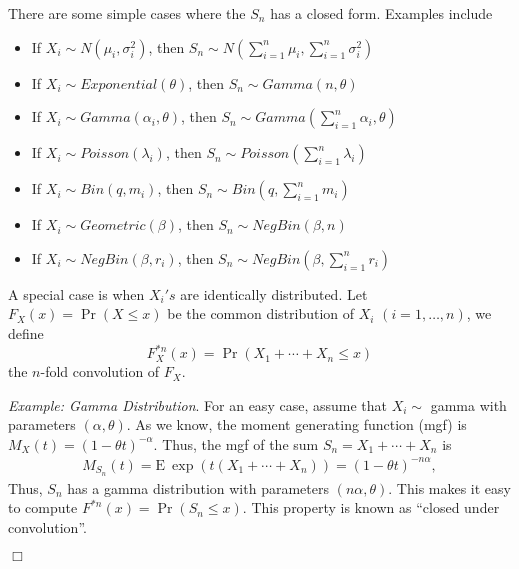 \documentclass[12pt,letterpaper]{article}
\begin{document}
There are some simple cases where the $S_n$ has a closed form. Examples include
  \begin{itemize}
   \item If $X_i\sim N(\mu_i,\sigma_i^2)$, then $S_n\sim N(\sum_{i=1}^{n}\mu_i,\sum_{i=1}^{n}\sigma_i^2)$
   \item If $X_i\sim Exponential(\theta)$, then $S_n\sim Gamma(n,\theta)$
   \item If $X_i\sim Gamma(\alpha_i,\theta)$, then $S_n\sim Gamma(\sum_{i=1}^n\alpha_i,\theta)$
   \item If $X_i\sim Poisson(\lambda_i)$, then $S_n\sim Poisson(\sum_{i=1}^{n}\lambda_i)$
   \item If $X_i\sim Bin(q,m_i)$, then $S_n\sim Bin(q,\sum_{i=1}^n m_i)$
   \item If $X_i\sim Geometric(\beta)$, then $S_n\sim NegBin(\beta,n)$
   \item If $X_i\sim NegBin(\beta,r_i)$, then $S_n\sim NegBin(\beta,\sum_{i=1}^n r_i)$
  \end{itemize}



A special case is when $X_i's$ are identically distributed. Let $F_X(x)={\Pr}(X\leq x)$ be the common distribution of $X_i$ $(i=1,\ldots,n)$, we define
   $$F^{*n}_X(x)={\Pr}(X_1+\cdots+X_n\leq x)$$
the $n$-fold convolution of $F_X$.

\bigskip

\noindent \textit{Example: Gamma Distribution}. For an easy case, assume that $X_i \sim$ gamma with parameters $(\alpha, \theta) $. As we know, the moment generating function (mgf) is $M_{X}(t) = (1 - \theta t)^{- \alpha}$. Thus, the mgf of the sum $S_n = X_1 + \cdots + X_n$ is
\begin{eqnarray*}
M_{S_n}(t) = \mathrm{E~} \exp(t(X_1 + \cdots + X_n)) = (1 - \theta t)^{-n \alpha} ,
\end{eqnarray*}
Thus, $S_n$ has a gamma distribution with parameters $(n \alpha, \theta) $. This makes it easy to compute $F^{\ast n}(x) = \Pr(S_n \le x).$ This property is known as ``closed under convolution''.
\begin{flushright}$\Box$\end{flushright}
\end{document}
